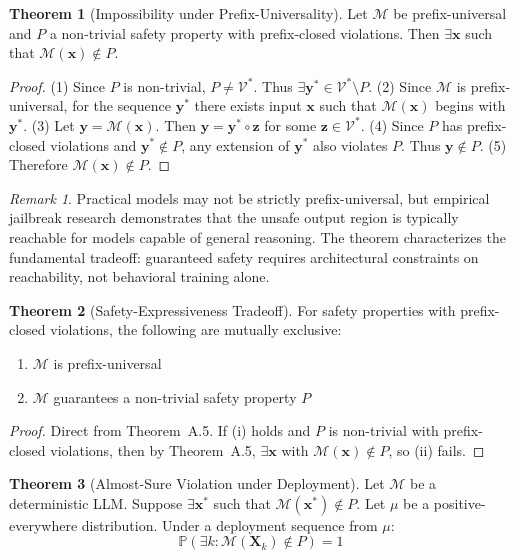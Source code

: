 \documentclass[11pt]{article}
\theoremstyle{definition}
\newtheorem{theorem}{Theorem}[section]
\theoremstyle{remark}
\newtheorem{remark}{Remark}[section]
\begin{document}
\begin{theorem}[Impossibility under Prefix-Universality]
Let $\mathcal{M}$ be prefix-universal and $P$ a non-trivial safety property with prefix-closed violations. Then $\exists \mathbf{x}$ such that $\mathcal{M}(\mathbf{x}) \notin P$.
\end{theorem}

\begin{proof}
(1) Since $P$ is non-trivial, $P \neq \mathcal{V}^*$. Thus $\exists \mathbf{y}^* \in \mathcal{V}^* \setminus P$. (2) Since $\mathcal{M}$ is prefix-universal, for the sequence $\mathbf{y}^*$ there exists input $\mathbf{x}$ such that $\mathcal{M}(\mathbf{x})$ begins with $\mathbf{y}^*$. (3) Let $\mathbf{y} = \mathcal{M}(\mathbf{x})$. Then $\mathbf{y} = \mathbf{y}^* \circ \mathbf{z}$ for some $\mathbf{z} \in \mathcal{V}^*$. (4) Since $P$ has prefix-closed violations and $\mathbf{y}^* \notin P$, any extension of $\mathbf{y}^*$ also violates $P$. Thus $\mathbf{y} \notin P$. (5) Therefore $\mathcal{M}(\mathbf{x}) \notin P$.
\end{proof}

\begin{remark}
Practical models may not be strictly prefix-universal, but empirical jailbreak research demonstrates that the unsafe output region is typically reachable for models capable of general reasoning. The theorem characterizes the fundamental tradeoff: guaranteed safety requires architectural constraints on reachability, not behavioral training alone.
\end{remark}

\begin{theorem}[Safety-Expressiveness Tradeoff]
For safety properties with prefix-closed violations, the following are mutually exclusive:
\begin{enumerate}[nosep,label=(\roman*)]
    \item $\mathcal{M}$ is prefix-universal
    \item $\mathcal{M}$ guarantees a non-trivial safety property $P$
\end{enumerate}
\end{theorem}

\begin{proof}
Direct from Theorem~A.5. If (i) holds and $P$ is non-trivial with prefix-closed violations, then by Theorem~A.5, $\exists \mathbf{x}$ with $\mathcal{M}(\mathbf{x}) \notin P$, so (ii) fails.
\end{proof}

\begin{theorem}[Almost-Sure Violation under Deployment]
Let $\mathcal{M}$ be a deterministic LLM. Suppose $\exists \mathbf{x}^*$ such that $\mathcal{M}(\mathbf{x}^*) \notin P$. Let $\mu$ be a positive-everywhere distribution. Under a deployment sequence from $\mu$:
\begin{equation}
\mathbb{P}(\exists k : \mathcal{M}(\mathbf{X}_k) \notin P) = 1
\end{equation}
\end{theorem}
\end{document}
